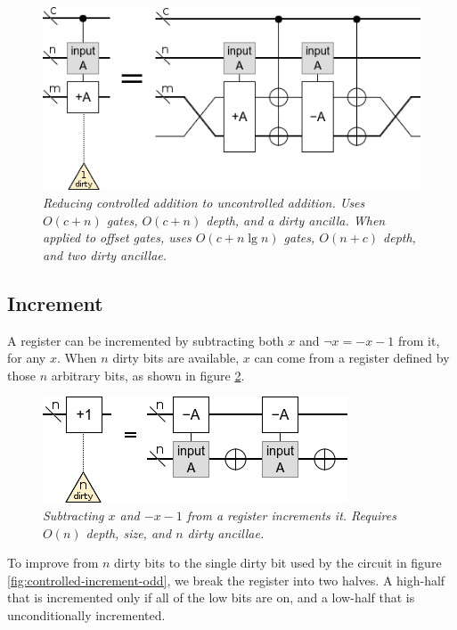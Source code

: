 \documentclass[twocolumn]{article}
\begin{document}
\begin{figure}
  \centering
  \includegraphics[width=\linewidth]{assets/controlled-addition.png}
  \caption{\em
  	Reducing controlled addition to uncontrolled addition.
  	Uses $O(c + n)$ gates, $O(c + n)$ depth, and a dirty ancilla.
  	When applied to offset gates, uses $O(c + n \lg n)$ gates, $O(n + c)$ depth, and two dirty ancillae.
  }
  \label{fig:controlled-addition}
\end{figure}


\subsection{Increment}

A register can be incremented by subtracting both $x$ and $\neg x = -x-1$ from it, for any $x$.
When $n$ dirty bits are available, $x$ can come from a register defined by those $n$ arbitrary bits, as shown in figure \ref{fig:increment-many-dirty}.

\begin{figure}
  \centering
  \includegraphics[width=\linewidth]{assets/increment-many-dirty.png}
  \caption{\em Subtracting $x$ and $-x-1$ from a register increments it. Requires $O(n)$ depth, size, and $n$ dirty ancillae.}
  \label{fig:increment-many-dirty}
\end{figure}

To improve from $n$ dirty bits to the single dirty bit used by the circuit in figure \ref{fig:controlled-increment-odd}, we break the register into two halves.
A high-half that is incremented only if all of the low bits are on, and a low-half that is unconditionally incremented.
\end{document}
